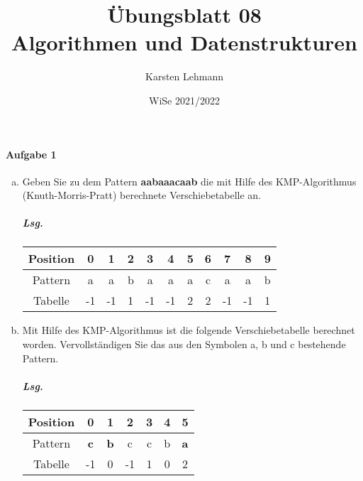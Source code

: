\documentclass{scrreprt}
\author{Karsten Lehmann}
\date{WiSe 2021/2022}
\title{Übungsblatt 08\\Algorithmen und Datenstrukturen}
\begin{document}
\paragraph{Aufgabe 1}
\begin{enumerate}[a)]
\item Geben Sie zu dem Pattern \textbf{aabaaacaab} die mit Hilfe des
  KMP-Algorithmus (Knuth-Morris-Pratt) berechnete Verschiebetabelle an.

  \subparagraph{Lsg.}
  \begin{tabular}{c|cccccccccc}
    Position & 0 & 1 & 2 & 3 & 4 & 5 & 6 & 7 & 8 & 9 \\
    \hline
    Pattern & a & a & b & a & a & a & c & a & a & b \\
    \hline
    Tabelle & -1 & -1 & 1 & -1 & -1 & 2 & 2 & -1 & -1 & 1
  \end{tabular}

\item Mit Hilfe des KMP-Algorithmus ist die folgende Verschiebetabelle berechnet
  worden.
  Vervollständigen Sie das aus den Symbolen a, b und c bestehende Pattern.

  \subparagraph{Lsg.}
  \begin{tabular}{c|cccccc}
    Position & 0 & 1 & 2 & 3 & 4 & 5 \\
    \hline
    Pattern & \textbf{c} & \textbf{b} & c & c & b & \textbf{a}  \\
    \hline
    Tabelle & -1 & 0 & -1 & 1 & 0 & 2
  \end{tabular}
\end{enumerate}
\end{document}
